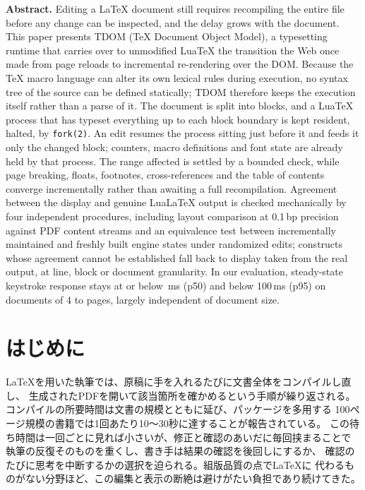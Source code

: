 \documentclass[a4paper,11pt]{ltjsarticle}
\newcommand{\tdom}{TDOM}
\newcommand{\code}[1]{\texttt{#1}}
\begin{document}
\begin{center}
\begin{minipage}{0.92\textwidth}
\small
\textbf{Abstract.}
Editing a \LaTeX{} document still requires recompiling the entire file before any
change can be inspected, and the delay grows with the document. This paper
presents \tdom{} (TeX Document Object Model), a typesetting runtime that carries
over to unmodified LuaTeX the transition the Web once made from page reloads to
incremental re-rendering over the DOM. Because the \TeX{} macro language can
alter its own lexical rules during execution, no syntax tree of the source can
be defined statically; \tdom{} therefore keeps the execution itself rather than
a parse of it. The document is split into blocks, and a LuaTeX process that has
typeset everything up to each block boundary is kept resident, halted, by
\code{fork(2)}. An edit resumes the process sitting just before it and feeds it
only the changed block; counters, macro definitions and font state are already
held by that process. The range affected is settled by a bounded check, while
page breaking, floats, footnotes, cross-references and the table of contents
converge incrementally rather than awaiting a full recompilation. Agreement between the
display and genuine LuaLaTeX output is checked mechanically by four independent
procedures, including layout comparison at 0.1\,bp precision against PDF
content streams and an equivalence test between incrementally maintained and
freshly built engine states under randomized edits; constructs whose agreement
cannot be established fall back to display taken from the real output, at line,
block or document granularity. In our evaluation, steady-state keystroke
response stays at or below \nWorstP\,ms (p50) and below 100\,ms (p95) on documents
of 4 to \nLpages{} pages, largely independent of document size.
\end{minipage}
\end{center}

\section{はじめに}\label{sec:intro}

\LaTeX{}を用いた執筆では、原稿に手を入れるたびに文書全体をコンパイルし直し、
生成されたPDFを開いて該当箇所を確かめるという手順が繰り返される。
コンパイルの所要時間は文書の規模とともに延び、パッケージを多用する
100ページ規模の書籍では1回あたり10〜30秒に達することが報告されている\cite{lode2026}。
この待ち時間は一回ごとに見れば小さいが、修正と確認のあいだに毎回挟まることで
執筆の反復そのものを重くし、書き手は結果の確認を後回しにするか、
確認のたびに思考を中断するかの選択を迫られる。組版品質の点で\LaTeX{}に
代わるものがない分野ほど、この編集と表示の断絶は避けがたい負担であり続けてきた。
\end{document}
